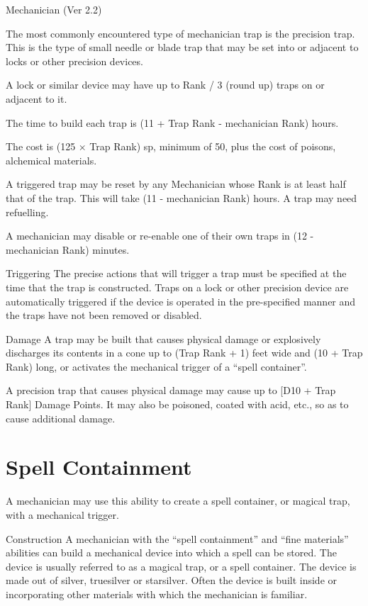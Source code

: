 \begin{Chapter}{Mechanician (Ver 2.2)}
\begin{Description}
The most commonly encountered type of mechanician trap is the
precision trap.  This is the type of small needle or blade trap that
may be set into or adjacent to locks or other precision devices.

A lock or similar device may have up to Rank / 3 (round up) traps on
or adjacent to it.

The time to build each trap is (11 + Trap Rank - mechanician Rank)
hours.

The cost is (125 × Trap Rank) sp, minimum of 50, plus the cost of
poisons, alchemical materials.

A triggered trap may be reset by any Mechanician whose Rank is at
least half that of the trap.  This will take (11 - mechanician Rank)
hours.  A trap may need refuelling.

A mechanician may disable or re-enable one of their own traps in (12 -
mechanician Rank) minutes.

\item[Triggering] The precise actions that will trigger a trap must be
  specified at the time that the trap is constructed.  Traps on a lock
  or other precision device are automatically triggered if the device
  is operated in the pre-specified manner and the traps have not been
  removed or disabled.

\item[Damage] A trap may be built that causes physical damage or
  explosively discharges its contents in a cone up to (Trap Rank + 1)
  feet wide and (10 + Trap Rank) long, or activates the mechanical
  trigger of a “spell container”.

  A precision trap that causes physical damage may cause up to [D10 +
    Trap Rank] Damage Points.  It may also be poisoned, coated with
  acid, etc., so as to cause additional damage.

\end{Description}

\section{Spell Containment}

A mechanician may use this ability to create a spell container, or
magical trap, with a mechanical trigger.

\begin{Description}

\item[Construction] A mechanician with the “spell containment” and
  “fine materials” abilities can build a mechanical device into which
  a spell can be stored.  The device is usually referred to as a
  magical trap, or a spell container.  The device is made out of
  silver, truesilver or starsilver.  Often the device is built inside
  or incorporating other materials with which the mechanician is
  familiar.


\end{Description}
\end{Chapter}
